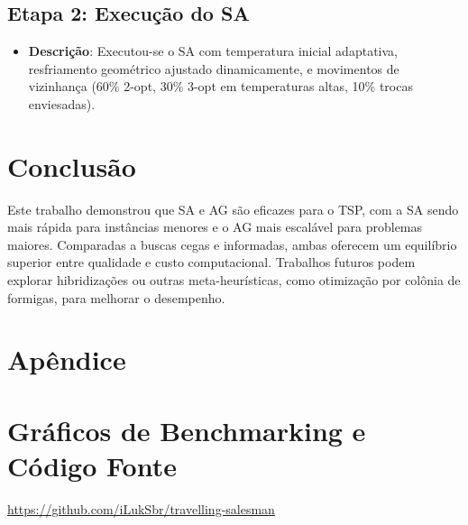 \documentclass[11pt]{article}
\begin{document}
\subsection{Etapa 2: Execução do SA}
\begin{itemize}
    \item \textbf{Descrição}: Executou-se o SA com temperatura inicial adaptativa, resfriamento geométrico ajustado dinamicamente, e movimentos de vizinhança (60\% 2-opt, 30\% 3-opt em temperaturas altas, 10\% trocas enviesadas).
\end{itemize}

\section{Conclusão}
Este trabalho demonstrou que SA e AG são eficazes para o TSP, com a SA sendo mais rápida para instâncias menores e o AG mais escalável para problemas maiores. Comparadas a buscas cegas e informadas, ambas oferecem um equilíbrio superior entre qualidade e custo computacional. Trabalhos futuros podem explorar hibridizações ou outras meta-heurísticas, como otimização por colônia de formigas, para melhorar o desempenho.




\section*{Apêndice}
\appendix

\section{Gráficos de Benchmarking e Código Fonte}\label{app:code}
\href{https://github.com/iLukSbr/travelling-salesman}{https://github.com/iLukSbr/travelling-salesman}

\clearpage
\end{document}
